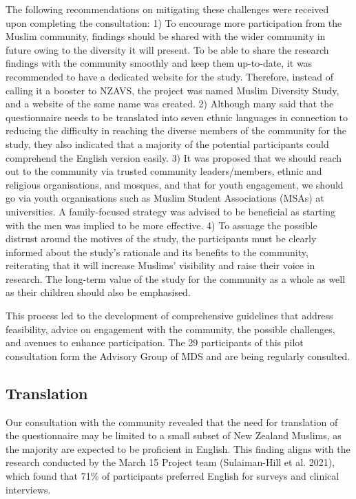 \documentclass[
]{interact}
\begin{document}
The following recommendations on mitigating these challenges were
received upon completing the consultation: 1) To encourage more
participation from the Muslim community, findings should be shared with
the wider community in future owing to the diversity it will present. To
be able to share the research findings with the community smoothly and
keep them up-to-date, it was recommended to have a dedicated website for
the study. Therefore, instead of calling it a booster to NZAVS, the
project was named Muslim Diversity Study, and a website of the same name
was created. 2) Although many said that the questionnaire needs to be
translated into seven ethnic languages in connection to reducing the
difficulty in reaching the diverse members of the community for the
study, they also indicated that a majority of the potential participants
could comprehend the English version easily. 3) It was proposed that we
should reach out to the community via trusted community leaders/members,
ethnic and religious organisations, and mosques, and that for youth
engagement, we should go via youth organisations such as Muslim Student
Associations (MSAs) at universities. A family-focused strategy was
advised to be beneficial as starting with the men was implied to be more
effective. 4) To assuage the possible distrust around the motives of the
study, the participants must be clearly informed about the study's
rationale and its benefits to the community, reiterating that it will
increase Muslims' visibility and raise their voice in research. The
long-term value of the study for the community as a whole as well as
their children should also be emphasised.

This process led to the development of comprehensive guidelines that
address feasibility, advice on engagement with the community, the
possible challenges, and avenues to enhance participation. The 29
participants of this pilot consultation form the Advisory Group of MDS
and are being regularly consulted.

\subsection{Translation}\label{translation}

Our consultation with the community revealed that the need for
translation of the questionnaire may be limited to a small subset of New
Zealand Muslims, as the majority are expected to be proficient in
English. This finding aligns with the research conducted by the March 15
Project team (Sulaiman-Hill et al. 2021), which found that 71\% of
participants preferred English for surveys and clinical interviews.
\end{document}
